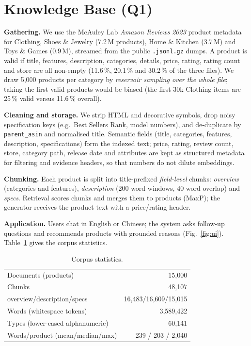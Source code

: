 \documentclass[10pt,a4paper,twocolumn]{article}
\newcommand{\code}[1]{\texttt{\small #1}}
\begin{document}
\section{Knowledge Base (Q1)}
\textbf{Gathering.} We use the McAuley Lab \emph{Amazon Reviews 2023} product metadata~\cite{hou2024} for Clothing, Shoes \& Jewelry (7.2\,M products), Home \& Kitchen (3.7\,M) and Toys \& Games (0.9\,M), streamed from the public \code{.jsonl.gz} dumps. A product is valid if title, features, description, categories, details, price, rating, rating count and store are all non-empty (11.6\,\%, 20.1\,\% and 30.2\,\% of the three files). We draw 5,000 products per category by \emph{reservoir sampling over the whole file}; taking the first valid products would be biased (the first 30k Clothing items are 25\,\% valid versus 11.6\,\% overall).

\textbf{Cleaning and storage.} We strip HTML and decorative symbols, drop noisy specification keys (e.g.\ Best Sellers Rank, model numbers), and de-duplicate by \code{parent\_asin} and normalised title. Semantic fields (title, categories, features, description, specifications) form the indexed text; price, rating, review count, store, category path, release date and attributes are kept as structured metadata for filtering and evidence headers, so that numbers do not dilute embeddings.

\textbf{Chunking.} Each product is split into title-prefixed \emph{field-level} chunks: \emph{overview} (categories and features), \emph{description} (200-word windows, 40-word overlap) and \emph{specs}. Retrieval scores chunks and merges them to products (MaxP); the generator receives the product text with a price/rating header.

\textbf{Application.} Users chat in English or Chinese; the system asks follow-up questions and recommends products with grounded reasons (Fig.~\ref{fig:ui}). Table~\ref{tab:corpus} gives the corpus statistics.

\begin{table}[!htb]
\centering\small
\caption{Corpus statistics.}
\label{tab:corpus}
\begin{tabular}{@{}l r@{}}
\toprule
Documents (products) & 15,000\\
Chunks & 48,107\\
\quad overview/description/specs & 16,483/16,609/15,015\\
Words (whitespace tokens) & 3,589,422\\
Types (lower-cased alphanumeric) & 60,141\\
Words/product (mean/median/max) & 239 / 203 / 2,040\\
\bottomrule
\end{tabular}
\end{table}
\end{document}
